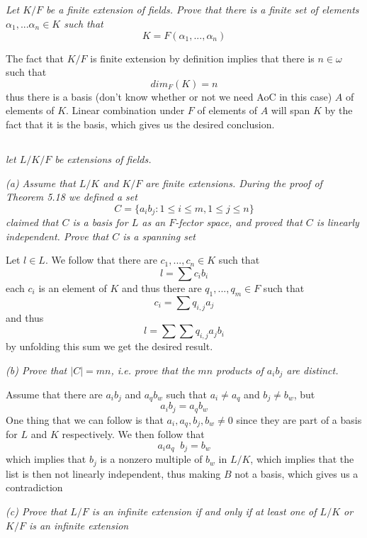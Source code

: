 \documentclass[11pt,oneside,titlepage]{book}
\DeclareMathOperator \inv {^{-1}}
\newcommand{\set}[1]{\{ #1 \}}
\begin{document}
\subsection{}

\textit{Let $K/F$ be a finite extension of fields. Prove that there is a
  finite set of elements $\alpha_1, ... \alpha_n \in K$ such that
  $$K = F(\alpha_1, ..., \alpha_n)$$
}

The fact that $K/F$ is finite extension by definition implies that
there is $n \in \omega$ such that
$$dim_F(K) = n$$
thus there is a basis (don't know whether or not we need AoC in this
case) $A$ of elements of $K$. Linear combination under $F$ of elements
of $A$ will span $K$ by the fact that it is the basis, which
gives us the desired conclusion.

\subsection{}

\textit{let $L/K/F$ be extensions of fields.}

\textit{(a) Assume that $L/K$ and $K/F$ are finite extensions. During
the proof of Theorem 5.18 we defined a set
  $$C = \set{a_i b_j: 1 \leq i \leq m, 1 \leq j \leq n}$$
  claimed that $C$ is a basis for $L$ as an $F$-fector space, and
  proved that $C$ is linearly independent. Prove that $C$ is a spanning
  set}

Let $l \in L$. We follow that there are $c_1, ..., c_n \in K$ such that
$$l = \sum{c_i b_i}$$
each $c_i$ is an element of $K$ and thus there are $q_1, ..., q_m \in F$
such that
$$c_i = \sum{q_{i, j} a_j}$$
and thus
$$l = \sum{\sum{q_{i, j} a_j} b_i}$$
by unfolding this sum we get the desired result.

\textit{(b) Prove that $|C| = mn$, i.e. prove that the $mn$ products
  of $a_i b_j$ are distinct.}

Assume that there are $a_i b_j$ and $a_q b_w$ such that
$a_i \neq a_q$ and $b_j \neq b_w$, but
$$a_i b_j = a_q b_w$$
One thing that we can follow is that $a_i, a_q, b_j, b_w \neq 0$ since
they are part of a basis for $L$ and $K$ respectively.
We then follow that
$$a_i a_q \inv b_j = b_w$$
which implies that $b_j$ is a nonzero multiple of $b_w$ in $L/K$,
which implies that the list is then not linearly independent, thus
making $B$ not a basis, which gives us a contradiction

\textit{(c) Prove that $L/F$ is an infinite extension if and only
  if at least one of $L/K$ or $K/F$ is
  an infinite extension}
\end{document}
